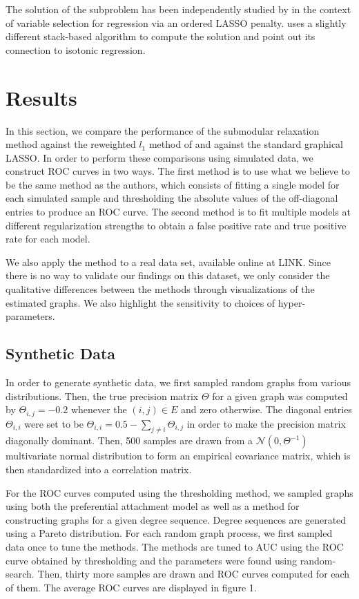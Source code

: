 \documentclass{uwstat572}
\theoremstyle{remark}
\theoremstyle{definition}
\begin{document}
The solution of the subproblem has been independently studied by \cite{su2016} in the context of variable selection for regression via an ordered LASSO penalty.  \cite{su2016} uses a slightly different stack-based algorithm to compute the solution and point out its connection to isotonic regression.


\section{Results}

In this section, we compare the performance of the submodular relaxation method against the reweighted $l_1$ method of \cite{liu11c} and against the standard graphical LASSO.  In order to perform these comparisons using simulated data, we construct ROC curves in two ways.  The first method is to use what we believe to be the same method as the authors, which consists of fitting a single model for each simulated sample and thresholding the absolute values of the off-diagonal entries to produce an ROC curve.  The second method is to fit multiple models at different regularization strengths to obtain a false positive rate and true positive rate for each model.

We also apply the method to a real data set, available online at LINK.  Since there is no way to validate our findings on this dataset, we only consider the qualitative differences between the methods through visualizations of the estimated graphs. We also highlight the sensitivity to choices of hyper-parameters.

\subsection{Synthetic Data}

In order to generate synthetic data, we first sampled random graphs from various distributions.  Then, the true precision matrix $\Theta$ for a given graph was computed by $\Theta_{i,j} = -0.2$ whenever the $(i,j) \in E$ and zero otherwise.  The diagonal entries $\Theta_{i,i}$ were set to be $\Theta_{i,i} = 0.5 - \sum_{j \neq i} \Theta_{i,j}$ in order to make the precision matrix diagonally dominant.  Then, 500 samples are drawn from a  $\mathcal{N}(0,\Theta^{-1})$ multivariate normal distribution to form an empirical covariance matrix, which is then standardized into a correlation matrix.

For the ROC curves computed using the thresholding method, we sampled graphs using both the preferential attachment model as well as a method for constructing graphs for a given degree sequence.  Degree sequences are generated using a Pareto distribution. For each random graph process, we first sampled data once to tune the methods.   The methods are tuned to AUC using the ROC curve obtained by thresholding and the parameters were found using random-search.  Then, thirty more samples are drawn and ROC curves computed for each of them.  The average ROC curves are displayed in figure 1.
\end{document}
